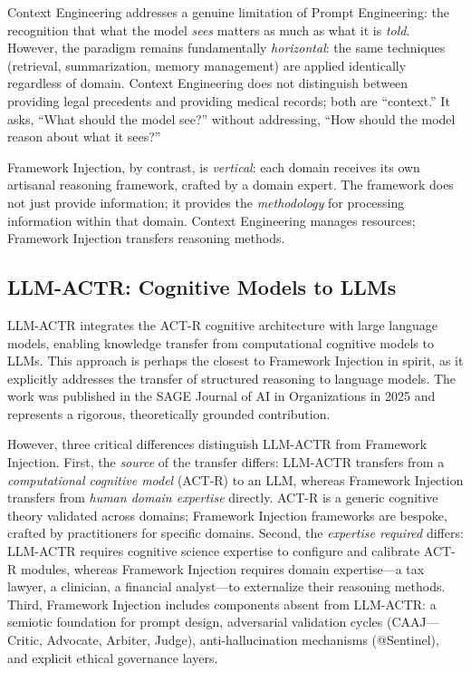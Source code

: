 \documentclass[12pt,a4paper]{article}
\begin{document}
Context Engineering addresses a genuine limitation of Prompt Engineering: the recognition that what the model \emph{sees} matters as much as what it is \emph{told}. However, the paradigm remains fundamentally \emph{horizontal}: the same techniques (retrieval, summarization, memory management) are applied identically regardless of domain. Context Engineering does not distinguish between providing legal precedents and providing medical records; both are ``context.'' It asks, ``What should the model see?'' without addressing, ``How should the model reason about what it sees?''

Framework Injection, by contrast, is \emph{vertical}: each domain receives its own artisanal reasoning framework, crafted by a domain expert. The framework does not just provide information; it provides the \emph{methodology} for processing information within that domain. Context Engineering manages resources; Framework Injection transfers reasoning methods.

\subsection{LLM-ACTR: Cognitive Models to LLMs}
\label{sec:related:actr}

LLM-ACTR \citep{wu2025cognitive} integrates the ACT-R cognitive architecture \citep{anderson2004integrated} with large language models, enabling knowledge transfer from computational cognitive models to LLMs. This approach is perhaps the closest to Framework Injection in spirit, as it explicitly addresses the transfer of structured reasoning to language models. The work was published in the SAGE Journal of AI in Organizations in 2025 and represents a rigorous, theoretically grounded contribution.

However, three critical differences distinguish LLM-ACTR from Framework Injection. First, the \emph{source} of the transfer differs: LLM-ACTR transfers from a \emph{computational cognitive model} (ACT-R) to an LLM, whereas Framework Injection transfers from \emph{human domain expertise} directly. ACT-R is a generic cognitive theory validated across domains; Framework Injection frameworks are bespoke, crafted by practitioners for specific domains. Second, the \emph{expertise required} differs: LLM-ACTR requires cognitive science expertise to configure and calibrate ACT-R modules, whereas Framework Injection requires domain expertise---a tax lawyer, a clinician, a financial analyst---to externalize their reasoning methods. Third, Framework Injection includes components absent from LLM-ACTR: a semiotic foundation for prompt design, adversarial validation cycles (CAAJ---Critic, Advocate, Arbiter, Judge), anti-hallucination mechanisms (@Sentinel), and explicit ethical governance layers.
\end{document}
